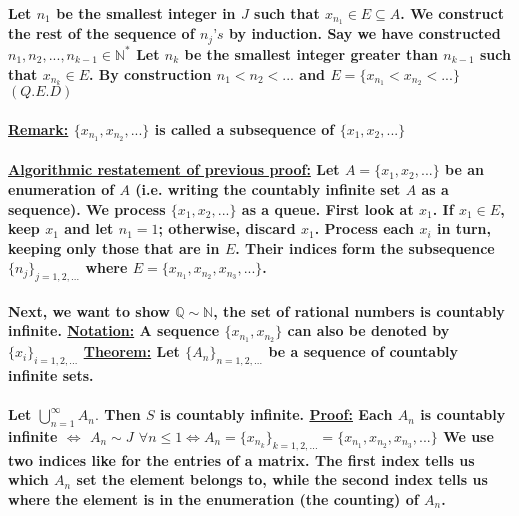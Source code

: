 \documentclass[10pt,a4paper]{article}
\begin{document}
\paragraph{Let $n_{1}$ be the smallest integer in $J$ such that $x_{n_{1}} \in E \subseteq A$. \newline
We construct the rest of the sequence of $n_{j}’s$ by induction. Say we have constructed $n_{1}, n_{2}, ..., n_{k-1} \in \mathbb{N}^{*}$ Let $n_{k}$ be the smallest integer greater than $n_{k-1}$ such that $x_{n_{k}} \in E$. By construction $n_{1} < n_{2} < ...$ and $E = \lbrace x_{n_{1}} < x_{n_{2}} < ...\rbrace$ $(Q.E.D)$}
\newpage
\paragraph{\underline{Remark:} $\lbrace x_{n_{1}} , x_{n_{2}} , ...\rbrace$ is called a subsequence of $\lbrace x_{1} , x_{2} , ...\rbrace$}

\paragraph{\underline{Algorithmic restatement of previous proof:}\newline
Let $A = \lbrace x_{1}, x_{2}, ...\rbrace$ be an enumeration of $A$ (i.e. writing the countably infinite set $A$ as a sequence). We process $\lbrace x_{1}, x_{2}, ...\rbrace$ as a queue. First look at $x_{1}$. If $x_{1} \in E$, keep $x_{1}$ and let $n_{1} = 1$; otherwise, discard $x_{1}$. Process each $x_{i}$ in turn, keeping only those that are in $E$. Their indices form the subsequence $\lbrace n_{j} \rbrace _{j = 1,2,...}$ where $E = \lbrace x_{n_{1}},x_{n_{2}},x_{n_{3}},...\rbrace$.}

\paragraph{Next, we want to show $\mathbb{Q} \sim \mathbb{N}$, the set of rational numbers is countably infinite.
\newline
\underline{Notation:} A sequence $\lbrace x_{n_{1}} , x_{n_{2}} \rbrace$ can also be denoted by $\lbrace x_{i}\rbrace _{i=1,2,...}$
\newline
\underline{Theorem:} Let $\lbrace A_{n}\rbrace _{n=1,2,...}$ be a sequence of countably infinite sets.}

\paragraph{Let $\bigcup\limits_{n=1}^{\infty} A_{n}.$ Then $S$ is countably infinite.
\newline
\underline{Proof:} Each $A_{n}$ is countably infinite $\iff$
\newline 
 $A_{n} \sim J$ $ \forall n \leq 1 \iff A_{n} = \lbrace x_{n_{k}}\rbrace _{k = 1,2,...} = \lbrace x_{n_{1}},x_{n_{2}},x_{n_{3}},...\rbrace$
 \newline 
 We use two indices like for the entries of a matrix. The first index tells us which $A_{n}$ set the element belongs to, while the second index tells us where the element is in the enumeration (the counting) of $A_{n}$.
 }
\end{document}
